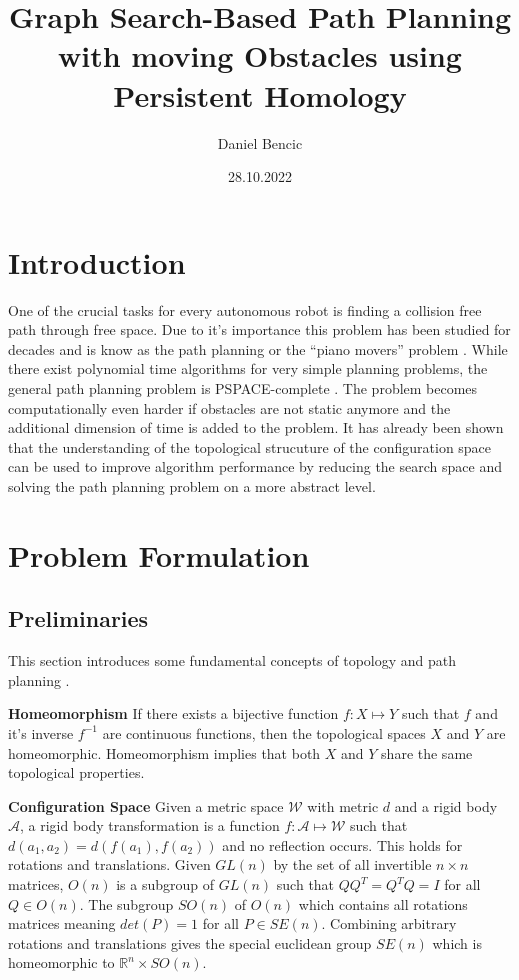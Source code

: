 \documentclass[]{article}
\title{Graph Search-Based Path Planning with moving Obstacles using Persistent Homology}
\author{Daniel Bencic}
\date{28.10.2022}
\begin{document}
\maketitle

\section{Introduction} One of the crucial tasks for every autonomous
robot is finding a collision free path through free space. Due to it's
importance this problem has been studied for decades and is know as
the path planning or the ``piano movers'' problem
\cite{schwartzPianoMoversProblem1983a,schwartzPianoMoversProblem1983b}.
While there exist polynomial time algorithms for very simple planning
problems, the general path planning problem is PSPACE-complete
\cite{reifComplexityMoverProblem1979}. The problem becomes
computationally even harder if obstacles are not static anymore and
the additional dimension of time is added to the
problem. It has already been shown that the understanding of the
topological strucuture of the configuration space can be used to
improve algorithm performance by reducing the search space and solving
the path planning problem on a more abstract level.

\section{Problem Formulation}
\subsection*{Preliminaries} This section introduces some fundamental
concepts of topology and path planning
\cite{munkresTopology2014,lavallePlanningAlgorithms2006,hatcherAlgebraicTopology2002,
otterRoadmapComputationPersistent2017}.

\textbf{Homeomorphism} If there exists a bijective function
\(f: X \mapsto Y\) such that \(f\) and it's inverse \(f^{-1}\) are
continuous functions, then the topological spaces \(X\) and \(Y\) are
homeomorphic. Homeomorphism implies that both \(X\) and \(Y\) share
the same topological properties.

\textbf{Configuration Space} Given a metric space \(\mathcal{W}\) with
metric \(d\) and a rigid body \(\mathcal{A}\), a rigid body
transformation is a function \(f: \mathcal{A} \mapsto \mathcal{W}\)
such that \(d(a_{1}, a_{2}) = d(f(a_{1}), f(a_{2}))\) and no
reflection occurs. This holds for rotations and translations. Given
\(GL(n)\) by the set of all invertible \(n \times n\) matrices,
\(O(n)\) is a subgroup of \(GL(n)\) such that \(QQ^{T} = Q^{T}Q = I\)
for all \(Q \in O(n)\). The subgroup \(SO(n)\) of \(O(n)\) which
contains all rotations matrices meaning \(det(P) = 1\) for all
\(P \in SE(n)\). Combining arbitrary rotations and translations gives
the special euclidean group \(SE(n)\) which is homeomorphic to
\(\mathbb{R}^{n} \times SO(n)\).
\end{document}
